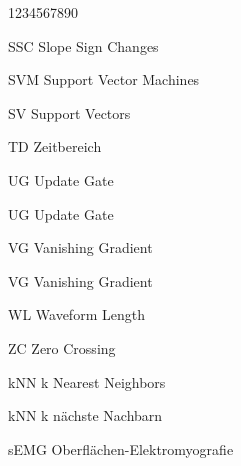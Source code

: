 \begin{labeling}{1234567890}
        \item[SSC] Slope Sign Changes
        \item[SVM] Support Vector Machines
        \item[SV] Support Vectors
        \item[TD] Zeitbereich
        \item[UG] Update Gate
        \item[UG] Update Gate
        \item[VG] Vanishing Gradient
        \item[VG] Vanishing Gradient
        \item[WL] Waveform Length
        \item[ZC] Zero Crossing
        \item[kNN] k Nearest Neighbors
        \item[kNN] k nächste Nachbarn 
        \item[sEMG] Oberflächen-Elektromyografie
\end{labeling} 